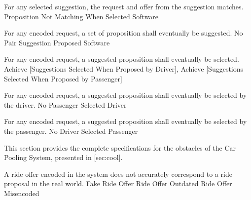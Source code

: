   \startkaosspec
  	 {For any selected suggestion, the request and offer from the suggestion matches.}
  	 {Proposition Not Matching When Selected}
  	 {Software}
  \stopkaosspec

  \startkaosspec
  	 {For any encoded request, a set of proposition shall eventually be suggested.}
  	 {No Pair Suggestion Proposed}
  	 {Software}
  \stopkaosspec

  \startkaosspec
  	 {For any encoded request, a suggested proposition shall eventually be selected.}
  	 {Achieve [Suggestions Selected When Proposed by Driver], Achieve [Suggestions Selected When Proposed by Passenger]}
  \stopkaosspec

  \startkaosspec
  	 {For any encoded request, a suggested proposition shall eventually be selected by the driver.}
  	 {No Passenger Selected}
  	 {Driver}
  \stopkaosspec

  \startkaosspec
  	 {For any encoded request, a suggested proposition shall eventually be selected by the passenger.}
  	 {No Driver Selected}
  	 {Passenger}
  \stopkaosspec
  
\stopsubsection

\startsubsection[title={Obstacle specifications}]

  This section provides the complete specifications for the obstacles of the
  Car Pooling System, presented in [sec:cool].


    {}

  \startkaosspec
  	 {A ride offer encoded in the system does not accurately
          correspond  to a ride proposal in the real world.}
  	 {Fake Ride Offer}
  	 {Ride Offer Outdated}
  	 {Ride Offer Misencoded}
  \stopkaosspec

